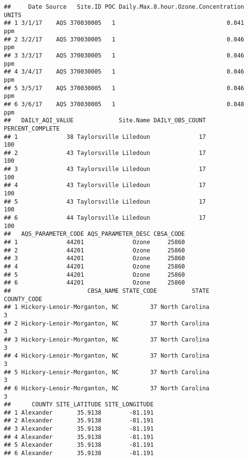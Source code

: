 \documentclass[]{article}
\newenvironment{Shaded}{\begin{snugshade}}{\end{snugshade}}
\newcommand{\KeywordTok}[1]{\textcolor[rgb]{0.13,0.29,0.53}{\textbf{#1}}}
\newcommand{\FloatTok}[1]{\textcolor[rgb]{0.00,0.00,0.81}{#1}}
\newcommand{\CommentTok}[1]{\textcolor[rgb]{0.56,0.35,0.01}{\textit{#1}}}
\newcommand{\OperatorTok}[1]{\textcolor[rgb]{0.81,0.36,0.00}{\textbf{#1}}}
\newcommand{\NormalTok}[1]{#1}
\begin{document}
\begin{verbatim}
##     Date Source   Site.ID POC Daily.Max.8.hour.Ozone.Concentration UNITS
## 1 3/1/17    AQS 370030005   1                                0.041   ppm
## 2 3/2/17    AQS 370030005   1                                0.046   ppm
## 3 3/3/17    AQS 370030005   1                                0.046   ppm
## 4 3/4/17    AQS 370030005   1                                0.046   ppm
## 5 3/5/17    AQS 370030005   1                                0.046   ppm
## 6 3/6/17    AQS 370030005   1                                0.048   ppm
##   DAILY_AQI_VALUE             Site.Name DAILY_OBS_COUNT PERCENT_COMPLETE
## 1              38 Taylorsville Liledoun              17              100
## 2              43 Taylorsville Liledoun              17              100
## 3              43 Taylorsville Liledoun              17              100
## 4              43 Taylorsville Liledoun              17              100
## 5              43 Taylorsville Liledoun              17              100
## 6              44 Taylorsville Liledoun              17              100
##   AQS_PARAMETER_CODE AQS_PARAMETER_DESC CBSA_CODE
## 1              44201              Ozone     25860
## 2              44201              Ozone     25860
## 3              44201              Ozone     25860
## 4              44201              Ozone     25860
## 5              44201              Ozone     25860
## 6              44201              Ozone     25860
##                      CBSA_NAME STATE_CODE          STATE COUNTY_CODE
## 1 Hickory-Lenoir-Morganton, NC         37 North Carolina           3
## 2 Hickory-Lenoir-Morganton, NC         37 North Carolina           3
## 3 Hickory-Lenoir-Morganton, NC         37 North Carolina           3
## 4 Hickory-Lenoir-Morganton, NC         37 North Carolina           3
## 5 Hickory-Lenoir-Morganton, NC         37 North Carolina           3
## 6 Hickory-Lenoir-Morganton, NC         37 North Carolina           3
##      COUNTY SITE_LATITUDE SITE_LONGITUDE
## 1 Alexander       35.9138        -81.191
## 2 Alexander       35.9138        -81.191
## 3 Alexander       35.9138        -81.191
## 4 Alexander       35.9138        -81.191
## 5 Alexander       35.9138        -81.191
## 6 Alexander       35.9138        -81.191
\end{verbatim}

\begin{Shaded}
\end{Shaded}
\end{document}
